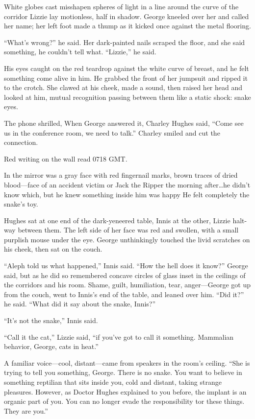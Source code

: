 White globes cast misshapen spheres of light in a line around the curve of the corridor Lizzie lay motionless, half in shadow. George kneeled over her and called her name; her left foot made a thump as it kicked once against the metal flooring.

``What's wrong?'' he said. Her dark-painted nails scraped the floor, and she said something, he couldn't tell what. ``Lizzie,'' he said.

His eyes caught on the red teardrop against the white curve of breast, and he felt something come alive in him. He grabbed the front of her jumpsuit and ripped it to the crotch. She clawed at his cheek, made a sound, then raised her head and looked at him, mutual recognition passing between them like a static shock: snake eyes.

The phone shrilled, When George answered it, Charley Hughes said, ``Come see us in the conference room, we need to talk.'' Charley smiled and cut the connection.

Red writing on the wall read 0718 GMT.

In the mirror was a gray face with red fingernail marks, brown traces of dried blood—face of an accident victim or Jack the Ripper the morning after\ldots he didn't know which, but he knew something inside him was happy He felt completely the snake's toy.

Hughes sat at one end of the dark-yeneered table, Innis at the other, Lizzie halt-way between them. The left side of her face was red and swollen, with a small purplish mouse under the eye. George unthinkingly touched the livid scratches on his cheek, then sat on the couch.

``Aleph told us what happened,'' Innis said. ``How the hell does it know?'' George said, but as he did so remembered concave circles of glass inset in the ceilings of the corridors and his room. Shame, guilt, humiliation, tear, anger—George got up from the couch, went to Innis's end of the table, and leaned over him. ``Did it?'' he said. ``What did it say about the snake, Innis?''

``It's not the snake,'' Innis said.

``Call it the cat,'' Lizzie said, ``if you've got to call it something. Mammalian behavior, George, cats in heat.''

A familiar voice—cool, distant—came from speakers in the room's ceiling. ``She is trying to tell you something, George. There is no snake. You want to believe in something reptilian that sits inside you, cold and distant, taking strange pleasures. However, as Doctor Hughes explained to you before, the implant is an organic part of you. You can no longer evade the responsibility tor these things. They are you.''

